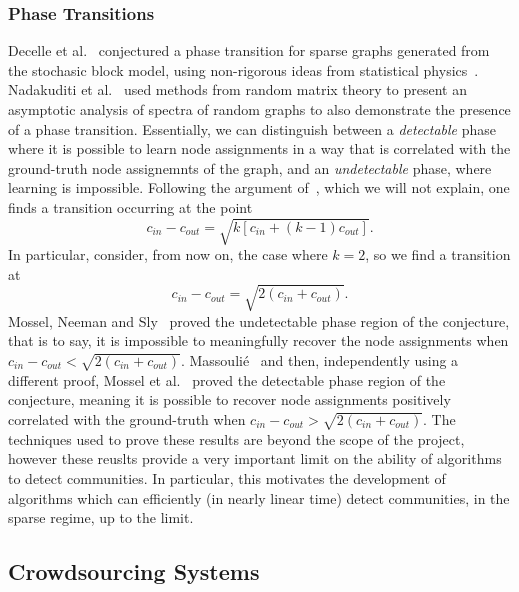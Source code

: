 \documentclass[12pt]{article}
\numberwithin{equation}{section}
\begin{document}
\subsubsection{Phase Transitions}
\label{sec:background;subsec:communityDetection;subsubsec:phaseTransitions}

Decelle et al.~\cite{DKM+11} conjectured a phase transition for sparse graphs generated from the stochasic block model, using non-rigorous ideas from statistical physics~\cite{MNS12}. Nadakuditi et al.~\cite{NN12} used methods from random matrix theory to present an asymptotic analysis of spectra of random graphs to also demonstrate the presence of a phase transition. Essentially, we can distinguish between a \textsl{detectable} phase where it is possible to learn node assignments in a way that is correlated with the ground-truth node assignemnts of the graph, and an \textsl{undetectable} phase, where learning is impossible. Following the argument of~\cite{NN12}, which we will not explain, one finds a transition occurring at the point
\begin{equation}
\label{eq:phaseTransitionK}
	c_{in} - c_{out} = \sqrt{k[c_{in} + (k-1)c_{out}]}.
\end{equation}
In particular, consider, from now on, the case where $k = 2$, so we find a transition at
\begin{equation}
\label{eq:phaseTransitionK}
	c_{in} - c_{out} = \sqrt{2(c_{in} + c_{out})}.
\end{equation}
Mossel, Neeman and Sly~\cite{MNS12} proved the undetectable phase region of the conjecture, that is to say, it is impossible to meaningfully recover the node assignments when $ c_{in} - c_{out} < \sqrt{2(c_{in} + c_{out})}$. Massouli\'e~\cite{Mas13} and then, independently using a different proof, Mossel et al.~\cite{MNS13b} proved the detectable phase region of the conjecture, meaning it is possible to recover node assignments positively correlated with the ground-truth when $ c_{in} - c_{out} > \sqrt{2(c_{in} + c_{out})}$. The techniques used to prove these results are beyond the scope of the project, however these reuslts provide a very important limit on the ability of algorithms to detect communities. In particular, this motivates the development of algorithms which can efficiently (in nearly linear time) detect communities, in the sparse regime, up to the limit.

\subsection{Crowdsourcing Systems}
\label{sec:background;subsec:crowdsourcingSystems}
\end{document}

